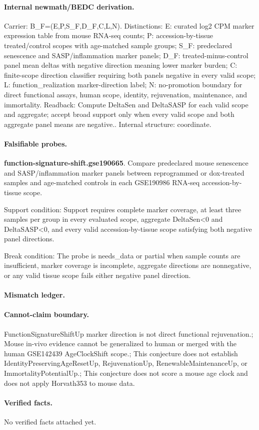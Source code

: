 \paragraph{Internal newmath/BEDC derivation.} Carrier: B\_F=(E,P,S\_F,D\_F,C,L,N). Distinctions: E: curated log2 CPM marker expression table from mouse RNA-seq counts; P: accession-by-tissue treated/control scopes with age-matched sample groups; S\_F: predeclared senescence and SASP/inflammation marker panels; D\_F: treated-minus-control panel mean deltas with negative direction meaning lower marker burden; C: finite-scope direction classifier requiring both panels negative in every valid scope; L: function\_realization marker-direction label; N: no-promotion boundary for direct functional assays, human scope, identity, rejuvenation, maintenance, and immortality. Readback: Compute DeltaSen and DeltaSASP for each valid scope and aggregate; accept broad support only when every valid scope and both aggregate panel means are negative.. Internal structure: coordinate.

\paragraph{Falsifiable probes.}
\textbf{function-signature-shift.gse190665}. Compare predeclared mouse senescence and SASP/inflammation marker panels between reprogrammed or dox-treated samples and age-matched controls in each GSE190986 RNA-seq accession-by-tissue scope.

Support condition: Support requires complete marker coverage, at least three samples per group in every evaluated scope, aggregate DeltaSen<0 and DeltaSASP<0, and every valid accession-by-tissue scope satisfying both negative panel directions.

Break condition: The probe is needs\_data or partial when sample counts are insufficient, marker coverage is incomplete, aggregate directions are nonnegative, or any valid tissue scope fails either negative panel direction.

\paragraph{Mismatch ledger.}
\paragraph{Cannot-claim boundary.} FunctionSignatureShiftUp marker direction is not direct functional rejuvenation.; Mouse in-vivo evidence cannot be generalized to human or merged with the human GSE142439 AgeClockShift scope.; This conjecture does not establish IdentityPreservingAgeResetUp, RejuvenationUp, RenewableMaintenanceUp, or ImmortalityPotentialUp.; This conjecture does not score a mouse age clock and does not apply Horvath353 to mouse data.

\paragraph{Verified facts.}
No verified facts attached yet.
